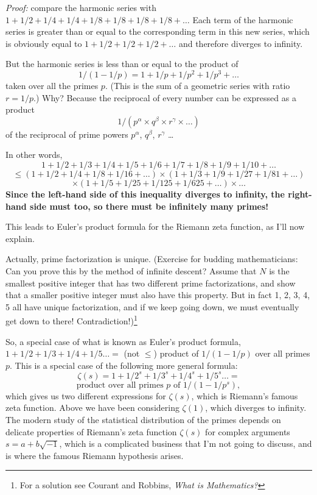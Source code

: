\documentclass[12pt]{book}
\begin{document}
\emph{Proof:} compare the harmonic series with $1 + 1/2 + 1/4 + 1/4 + 1/8 + 1/8 + 1/8 + 1/8 + \ldots$
Each term of the harmonic series is greater than or equal to the corresponding term in this new
series, which is obviously equal to $1 + 1/2 + 1/2 + 1/2 + \ldots$ and therefore diverges to infinity.

But the harmonic series is less than or equal to the product of 
\[
   1/(1-1/p) = 1 + 1/p + 1/p^2 + 1/p^3 + \ldots
\]
taken over all the primes $p$.
(This is the sum of a geometric series with ratio $r = 1/p$.)
Why?  Because the reciprocal of every number can be expressed as a product 
\[
 1/(p^{\alpha} \times q^{\beta} \times r^{\gamma} \times \ldots)
\]
of the reciprocal of prime powers $p^{\alpha}$, $q^{\beta}$, $r^{\gamma}$ \ldots

In other words,
\[
    1 + 1/2 + 1/3 + 1/4 + 1/5 + 1/6 + 1/7 + 1/8 + 1/9 + 1/10 + \ldots 
\]
\[
   \leq (1 + 1/2 + 1/4 + 1/8 + 1/16 + \ldots) \times (1 + 1/3 + 1/9 + 1/27 + 1/81 + \ldots)
\]
\[
   \times (1 + 1/5 + 1/25 + 1/125 + 1/625 + \ldots)
   \times \ldots
\]
\textbf{Since the left-hand side of this inequality diverges to infinity, the right-hand side must too,
so there must be infinitely many primes!}

This leads to Euler's product formula for the Riemann zeta function, as I'll now explain.

Actually, prime factorization is unique. (Exercise for budding mathematicians: 
Can you prove this by the
method of infinite descent?  Assume that $N$ is the smallest positive integer that
has two different prime factorizations, and show that a smaller positive
integer must also have this property.  But in fact 1, 2, 3, 4, 5 all have unique 
factorization, and if we keep going down, we must eventually get down to there!  Contradiction!)\footnote
{For a solution see Courant and Robbins, \emph{What is Mathematics?}}

So, a special case of what is known as Euler's product formula,
$1 + 1/2 + 1/3 + 1/4 + 1/5 \ldots =$ (not $\leq$)
product of $1/(1-1/p)$ over all primes $p$.
This is a special case of the following more general formula:
\[
   \zeta(s) = 1 + 1/2^s + 1/3^s + 1/4^s + 1/5^s \ldots = 
\]
\[
   \mbox{product over all primes $p$ of $1/(1-1/p^s)$},
\]
which gives us two different expressions for
$\zeta(s)$, which is Riemann's famous zeta function. Above we have been considering
$\zeta(1)$, which diverges to infinity.
The modern study of the statistical distribution of the primes depends on
delicate properties of Riemann's zeta function $\zeta(s)$ for complex arguments $s = a + b \sqrt{-1}$,
which is a complicated business that I'm not going to discuss, and is where the famous Riemann
hypothesis arises.
\end{document}
